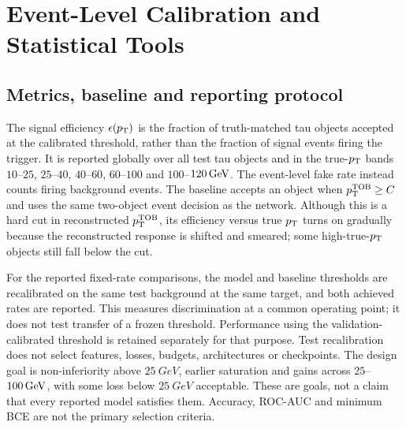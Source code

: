 \section{Event-Level Calibration and Statistical Tools}
\label{app:calibration}

\subsection{Metrics, baseline and reporting protocol}
\label{app:metric_protocol}
The signal efficiency $\epsilon(p_{\mathrm{T}})$ is the fraction of truth-matched tau objects accepted at the calibrated threshold, rather than the fraction of signal events firing the trigger. It is reported globally over all test tau objects and in the true-$p_{\mathrm{T}}$ bands $10$--$25$, $25$--$40$, $40$--$60$, $60$--$100$ and $100$--$120\,\mathrm{GeV}$. The event-level fake rate instead counts firing background events. The baseline accepts an object when $p_{\mathrm{T}}^{\mathrm{TOB}}\geq C$ and uses the same two-object event decision as the network. Although this is a hard cut in reconstructed $p_{\mathrm{T}}^{\mathrm{TOB}}$, its efficiency versus true $p_{\mathrm{T}}$ turns on gradually because the reconstructed response is shifted and smeared; some high-true-$p_{\mathrm{T}}$ objects still fall below the cut.

For the reported fixed-rate comparisons, the model and baseline thresholds are recalibrated on the same test background at the same target, and both achieved rates are reported. This measures discrimination at a common operating point; it does not test transfer of a frozen threshold. Performance using the validation-calibrated threshold is retained separately for that purpose. Test recalibration does not select features, losses, budgets, architectures or checkpoints. The design goal is non-inferiority above $\SI{25}{GeV}$, earlier saturation and gains across $25$--$100\,\mathrm{GeV}$, with some loss below $\SI{25}{GeV}$ acceptable. These are goals, not a claim that every reported model satisfies them. Accuracy, ROC-AUC and minimum BCE are not the primary selection criteria.

